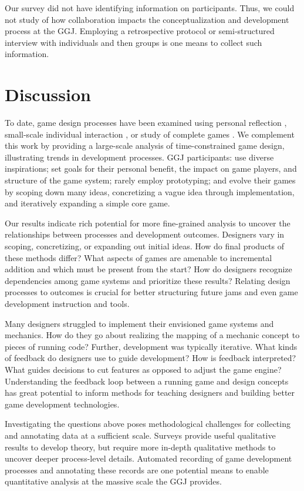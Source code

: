 \documentclass{sig-alternate}
\begin{document}
Our survey did not have identifying information on participants. Thus, we could not study of how collaboration impacts the conceptualization and development process at the GGJ. Employing a retrospective protocol or semi-structured interview with individuals and then groups is one means to collect such information.


\section{Discussion}
To date, game design processes have been examined using personal reflection \cite{anthropy2012:zinesters,hunicke2004:mda}, small-scale individual interaction \cite{nelson2009:reqanal}, or study of complete games \cite{bogost2011:howto}. We complement this work by providing a large-scale analysis of time-constrained game design, illustrating trends in development processes. GGJ participants: use diverse inspirations; set goals for their personal benefit, the impact on game players, and structure of the game system; rarely employ prototyping; and evolve their games by scoping down many ideas, concretizing a vague idea through implementation, and iteratively expanding a simple core game.

Our results indicate rich potential for more fine-grained analysis to uncover the relationships between processes and development outcomes. Designers vary in scoping, concretizing, or expanding out initial ideas. How do final products of these methods differ? What aspects of games are amenable to incremental addition and which must be present from the start? How do designers recognize dependencies among game systems and prioritize these results? Relating design processes to outcomes is crucial for better structuring future jams and even game development instruction and tools.

Many designers struggled to implement their envisioned game systems and mechanics. How do they go about realizing the mapping of a mechanic concept to pieces of running code? Further, development was typically iterative. What kinds of feedback do designers use to guide development? How is feedback interpreted? What guides decisions to cut features as opposed to adjust the game engine? Understanding the feedback loop between a running game and design concepts has great potential to inform methods for teaching designers and building better game development technologies.

Investigating the questions above poses methodological challenges for collecting and annotating data at a sufficient scale. Surveys provide useful qualitative results to develop theory, but require more in-depth qualitative methods to uncover deeper process-level details. Automated recording of game development processes and annotating these records are one potential means to enable quantitative analysis at the massive scale the GGJ provides.
\end{document}
